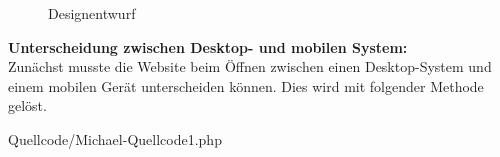 	
\begin{figure}[H]
\begin{center}
\caption{Designentwurf}
\end{center}
\end{figure}

\textbf{Unterscheidung zwischen Desktop- und mobilen System:}
\\
Zunächst musste die Website beim Öffnen zwischen einen Desktop-System und einem mobilen Gerät unterscheiden können. Dies wird mit folgender Methode gelöst.
\newpage
\begin{center}
	\begin{lstinputlisting}[language=PHP, caption={Unterscheidung Desktop und mobiles Gerät}]
		{Quellcode/Michael-Quellcode1.php}
	\end{lstinputlisting}
\end{center}

